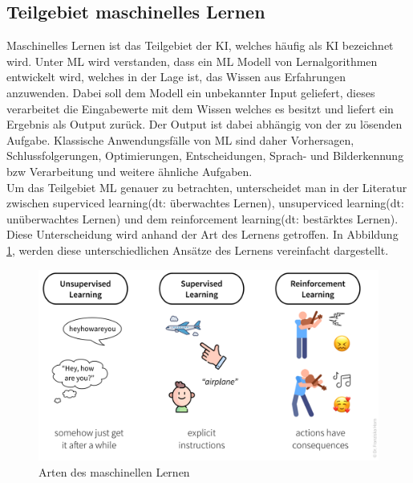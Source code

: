\begin{onehalfspace}
    \subsection{Teilgebiet maschinelles Lernen}
    \label{subsubsec:teilgebietML}
        Maschinelles Lernen ist das Teilgebiet der \ac{KI}, welches häufig als \ac*{KI} bezeichnet wird. Unter \ac{ML} wird verstanden, dass ein \ac*{ML} Modell von Lernalgorithmen entwickelt wird, welches in der Lage ist, das Wissen aus Erfahrungen anzuwenden. Dabei soll dem Modell ein unbekannter Input geliefert, dieses verarbeitet die Eingabewerte mit dem Wissen welches es besitzt und liefert ein Ergebnis als Output zurück. Der Output ist dabei abhängig von der zu lösenden Aufgabe. Klassische Anwendungsfälle von \ac*{ML} sind daher Vorhersagen, Schlussfolgerungen, Optimierungen, Entscheidungen, Sprach- und Bilderkennung \ac*{bzw} Verarbeitung und weitere ähnliche Aufgaben.\cite{HEGKI2019}
        \\
        Um das Teilgebiet \ac{ML} genauer zu betrachten, unterscheidet man in der Literatur zwischen \glqq{}superviced learning\grqq{}(\ac*{dt}: überwachtes Lernen), \glqq{}unsuperviced learning\grqq{}(\ac*{dt}: unüberwachtes Lernen) und dem \glqq{}reinforcement learning\grqq{}(\ac*{dt}: bestärktes Lernen).\cite{Datenkommission2019} Diese Unterscheidung wird anhand der Art des Lernens getroffen.\cite{Horn2022} In Abbildung \ref*{fig:ml_algorithms}, werden diese unterschiedlichen Ansätze des Lernens vereinfacht dargestellt. 
        \begin{figure}[h]
            \centering
            \includegraphics[width = 14cm]{Bilder/ml_algorithms.png}
            \caption{Arten des maschinellen Lernen\cite{Horn2022}}
            \label{fig:ml_algorithms}
        \end{figure}
        \\

\end{onehalfspace}
